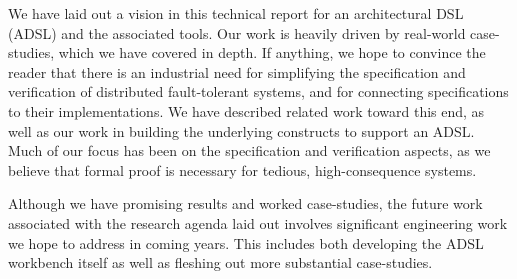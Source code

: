 We have laid out a vision in this technical report for an architectural DSL (ADSL)  and the associated tools. Our work is heavily driven by real-world case-studies, which we have covered in depth. If anything, we hope to convince the reader that there is an industrial need for simplifying the specification and verification of distributed fault-tolerant systems, and for connecting specifications to their implementations. We have described related work toward this end, as well as our work in building the underlying constructs to support an ADSL. Much of our focus has been on the specification and verification aspects, as we believe that formal proof is necessary for tedious, high-consequence systems.

Although we have promising results and worked case-studies, the future work associated with the research agenda laid out involves significant engineering work we hope to address in coming years. This includes both developing the ADSL workbench itself as well as fleshing out more substantial case-studies.

